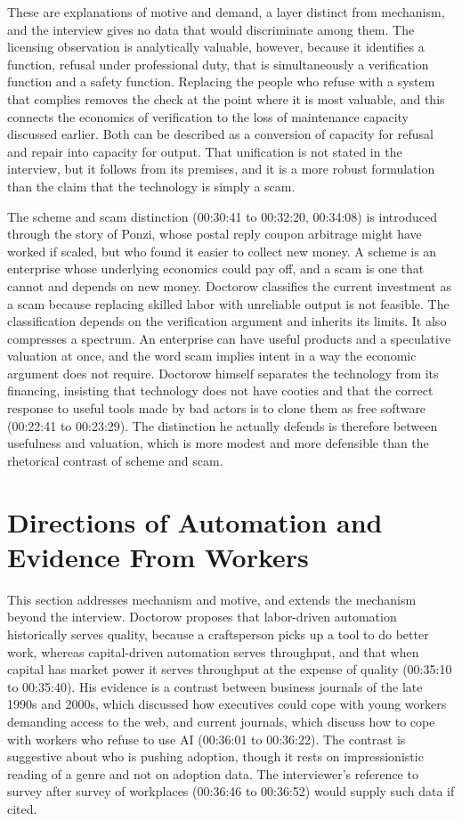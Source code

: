 \documentclass[12pt]{article}
\newcommand{\ts}[1]{(#1)}
\begin{document}
These are explanations of motive and demand, a layer distinct from mechanism, and the interview gives no data that would discriminate among them. The licensing observation is analytically valuable, however, because it identifies a function, refusal under professional duty, that is simultaneously a verification function and a safety function. Replacing the people who refuse with a system that complies removes the check at the point where it is most valuable, and this connects the economics of verification to the loss of maintenance capacity discussed earlier. Both can be described as a conversion of capacity for refusal and repair into capacity for output. That unification is not stated in the interview, but it follows from its premises, and it is a more robust formulation than the claim that the technology is simply a scam.

The scheme and scam distinction \ts{00:30:41 to 00:32:20, 00:34:08} is introduced through the story of Ponzi, whose postal reply coupon arbitrage might have worked if scaled, but who found it easier to collect new money. A scheme is an enterprise whose underlying economics could pay off, and a scam is one that cannot and depends on new money. Doctorow classifies the current investment as a scam because replacing skilled labor with unreliable output is not feasible. The classification depends on the verification argument and inherits its limits. It also compresses a spectrum. An enterprise can have useful products and a speculative valuation at once, and the word scam implies intent in a way the economic argument does not require. Doctorow himself separates the technology from its financing, insisting that technology does not have cooties and that the correct response to useful tools made by bad actors is to clone them as free software \ts{00:22:41 to 00:23:29}. The distinction he actually defends is therefore between usefulness and valuation, which is more modest and more defensible than the rhetorical contrast of scheme and scam.

\section{Directions of Automation and Evidence From Workers}

This section addresses mechanism and motive, and extends the mechanism beyond the interview. Doctorow proposes that labor-driven automation historically serves quality, because a craftsperson picks up a tool to do better work, whereas capital-driven automation serves throughput, and that when capital has market power it serves throughput at the expense of quality \ts{00:35:10 to 00:35:40}. His evidence is a contrast between business journals of the late 1990s and 2000s, which discussed how executives could cope with young workers demanding access to the web, and current journals, which discuss how to cope with workers who refuse to use AI \ts{00:36:01 to 00:36:22}. The contrast is suggestive about who is pushing adoption, though it rests on impressionistic reading of a genre and not on adoption data. The interviewer's reference to survey after survey of workplaces \ts{00:36:46 to 00:36:52} would supply such data if cited.
\end{document}
